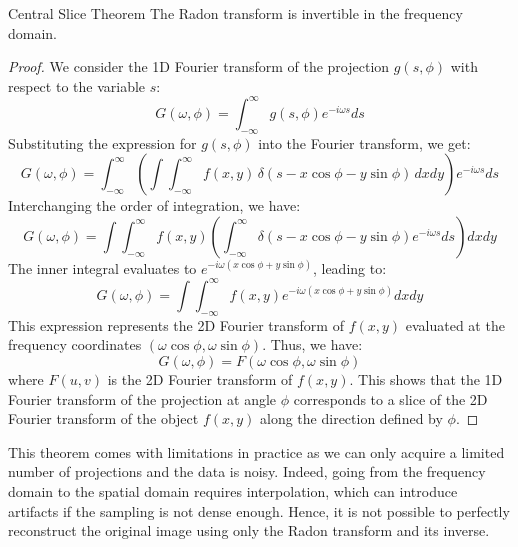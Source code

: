 \begin{theorem}{Central Slice Theorem}
\label{thm:central_slice}
    The Radon transform is invertible in the frequency domain.
\end{theorem}
\begin{proof}
    We consider the 1D Fourier transform of the projection $g(s,\phi)$ with respect to the variable $s$:
    \begin{equation*}
        G(\omega, \phi) = \int_{-\infty}^{\infty} g(s, \phi) e^{-i \omega s} ds
    \end{equation*}
    Substituting the expression for $g(s,\phi)$ into the Fourier transform, we get:
    \begin{equation*}
        G(\omega, \phi) = \int_{-\infty}^{\infty} \left( \int \int_{-\infty}^{\infty} f(x,y) \, \delta(s - x \cos \phi - y \sin \phi) \, dx dy \right) e^{-i \omega s} ds
    \end{equation*}
    Interchanging the order of integration, we have:
    \begin{equation*}
        G(\omega, \phi) = \int \int_{-\infty}^{\infty} f(x,y) \left( \int_{-\infty}^{\infty} \delta(s - x \cos \phi - y \sin \phi) e^{-i \omega s} ds \right) dx dy
    \end{equation*}
    The inner integral evaluates to $e^{-i \omega (x \cos \phi + y \sin \phi)}$, leading to:
    \begin{equation*}
        G(\omega, \phi) = \int \int_{-\infty}^{\infty} f(x,y) e^{-i \omega (x \cos \phi + y \sin \phi)} dx dy
    \end{equation*}
    This expression represents the 2D Fourier transform of $f(x,y)$ evaluated at the frequency coordinates $(\omega \cos \phi, \omega \sin \phi)$. Thus, we have:
    \begin{equation}
        G(\omega, \phi) = F(\omega \cos \phi, \omega \sin \phi)
    \end{equation}
    where $F(u,v)$ is the 2D Fourier transform of $f(x,y)$. This shows that the 1D Fourier transform of the projection at angle $\phi$ corresponds to a slice of the 2D Fourier transform of the object $f(x,y)$ along the direction defined by $\phi$.
\end{proof}


This theorem comes with limitations in practice as we can only acquire a limited number of projections and the data is noisy. Indeed, going from the frequency domain to the spatial domain requires interpolation, which can introduce artifacts if the sampling is not dense enough.
Hence, it is not possible to perfectly reconstruct the original image using only the Radon transform and its inverse. 

